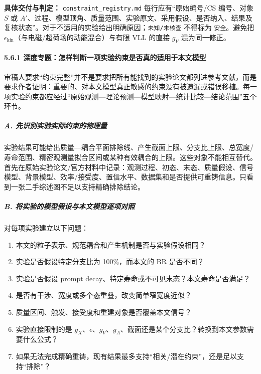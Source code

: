 \documentclass[
]{article}
\providecommand{\tightlist}{%
  \setlength{\itemsep}{0pt}\setlength{\parskip}{0pt}}
\begin{document}
\textbf{具体交付与判定：} \texttt{constraint\_registry.md}
每行应有``原始编号/CS 编号、对象 \(S\) 或
\(A'\)、过程、模型顶角、质量范围、实验原文、采用假设、是否纳入、结果及复核状态''。对于不适用的实验给出明确原因；\texttt{未知/未核查}
不得标为 \texttt{安全}。避免把
\(\epsilon_{\mathrm{kin}}\)（与电磁/超荷场的动能混合）与有限 VLL 的直接
\(g_V\) 混为同一修正。

\paragraph{5.6.1
深度专题：怎样判断一项实验约束是否真的适用于本文模型}\label{ux6df1ux5ea6ux4e13ux9898ux600eux6837ux5224ux65adux4e00ux9879ux5b9eux9a8cux7ea6ux675fux662fux5426ux771fux7684ux9002ux7528ux4e8eux672cux6587ux6a21ux578b}

审稿人要求``约束完整''并不是要求把所有能找到的实验论文都列进参考文献，而是要求作者证明：重要的、对本文模型真正敏感的约束没有被遗漏或错误移植。每一项实验约束都应经过``原始观测---理论预测---模型映射---统计比较---结论范围''五个环节。

\subparagraph{A.
先识别实验实际约束的物理量}\label{a.-ux5148ux8bc6ux522bux5b9eux9a8cux5b9eux9645ux7ea6ux675fux7684ux7269ux7406ux91cf}

实验结果可能给出质量---耦合平面排除线、产生截面上限、分支比上限、总宽度/寿命范围、精密观测量拟合区间或某种有效耦合的上限。这些对象不能相互替代。首先在原始实验论文/官方材料中记录：观测过程、初态、末态、质量假设、信号模型、背景模型、效率/接受度、置信水平、数据集和是否提供可重铸信息。只看到一张二手综述图不足以支持精确排除结论。

\subparagraph{B.
将实验的模型假设与本文模型逐项对照}\label{b.-ux5c06ux5b9eux9a8cux7684ux6a21ux578bux5047ux8bbeux4e0eux672cux6587ux6a21ux578bux9010ux9879ux5bf9ux7167}

对每项实验建立以下问题：

\begin{enumerate}
\def\labelenumi{\arabic{enumi}.}
\tightlist
\item
  本文的粒子表示、规范耦合和产生机制是否与实验假设相同？
\item
  实验是否假设特定分支比为 100\%，而本文的 BR 是否不同？
\item
  实验是否假设 prompt decay、特定寿命或不可见末态？本文寿命是否满足？
\item
  是否有干涉、宽度或多个态重叠，改变简单窄宽度近似？
\item
  质量区间、触发、接受度和重建对象是否覆盖本文信号？
\item
  实验直接限制的是
  \(g_X\)、\(\epsilon\)、\(g_V\)、\(g_A\)、截面还是某个分支比？转换到本文参数需要什么公式？
\item
  如果无法完成精确重铸，现有结果最多支持``相关/潜在约束''，还是足以支持``排除''？
\end{enumerate}
\end{document}
